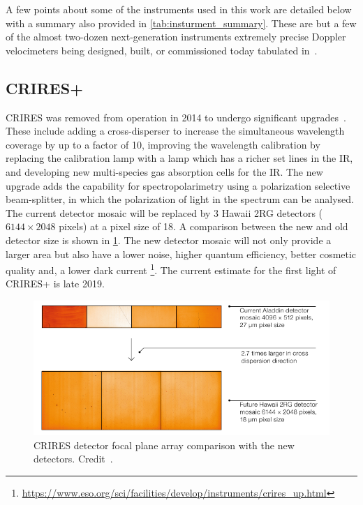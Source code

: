 A few points about some of the \nir{} instruments used in this work are detailed below with a summary also provided in \cref{tab:insturment_summary}.
These are but a few of the almost two-dozen next-generation instruments extremely precise Doppler velocimeters being designed, built, or commissioned today tabulated in~\citet{wright_third_2017}.



\subsection{CRIRES+}
\label{subsec:criresplus}
CRIRES was removed from operation in 2014 to undergo significant upgrades~\citep{dorn_crires_2014}.
These include adding a cross-disperser to increase the simultaneous wavelength coverage by up to a factor of 10, improving the wavelength calibration by replacing the \thar{} calibration lamp with a \une{} lamp which has a richer set lines in the IR, and developing new multi-species gas absorption cells for the {IR}.
The new upgrade adds the capability for spectropolarimetry using a polarization selective beam-splitter, in which the polarization of light in the spectrum can be analysed.
The current detector mosaic will be replaced by 3 Hawaii 2RG detectors (\(6144\times 2048\) pixels) at a pixel size of 18\um{}.
A comparison between the new and old detector size is shown in \cref{fig:criresplus_detecotrs}.
The new detector mosaic will not only provide a larger area but also have a lower noise, higher quantum efficiency, better cosmetic quality and, a lower dark current
\footnote{\href{https://www.eso.org/sci/facilities/develop/instruments/crires_up.html}{https://www.eso.org/sci/facilities/develop/instruments/crires\_up.html}}.
The current estimate for the first light of CRIRES+ is late 2019.

\begin{figure}
    \centering
    \includegraphics[width=0.6\linewidth]{figures/spectroscopy/criresplus_detectors.pdf}
    \caption[CRIRES/CRIRES+ detector focal plane arrays.]{CRIRES detector focal plane array comparison with the new detectors.
    Credit~\citet{dorn_crires_2014}.}
    \label{fig:criresplus_detecotrs}
\end{figure}

